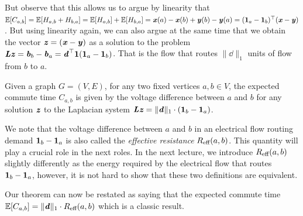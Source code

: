 But observe that this allows us to argue by linearity that $\mathbb{E}[C_{a,b}] = \mathbb{E}[H_{a,b} + H_{b,a}] = \mathbb{E}[H_{a,b}] + \mathbb{E}[H_{b,a}] = \boldsymbol{\mathit{x}}(a) - \boldsymbol{\mathit{x}}(b) + \boldsymbol{\mathit{y}}(b) - \boldsymbol{\mathit{y}}(a) = (\boldsymbol{1}_a - \boldsymbol{1}_b)^\top (\boldsymbol{\mathit{x}} - \boldsymbol{\mathit{y}})$. But using linearity again, we can also argue at the same time that we obtain the vector $\boldsymbol{\mathit{z}} = (\boldsymbol{\mathit{x}} - \boldsymbol{\mathit{y}})$ as a solution to the problem $\boldsymbol{\mathit{L}}\boldsymbol{\mathit{z}} = \boldsymbol{\mathit{b}}_b - \boldsymbol{\mathit{b}}_a = \boldsymbol{\mathit{d}}^\top \boldsymbol{1} (\boldsymbol{1}_a - \boldsymbol{1}_b)$. That is the flow that routes $\|\dd\|_1$ units of flow from $b$ to $a$.

\begin{theorem}
	Given a graph $G=(V,E)$, for any two fixed vertices $a,b \in V$, the expected commute time $C_{a,b}$ is given by the voltage difference between $a$ and $b$ for any solution $\boldsymbol{\mathit{z}}$ to the Laplacian system $\boldsymbol{\mathit{L}} \boldsymbol{\mathit{z}} = \|\boldsymbol{\mathit{d}}\|_1 \cdot (\boldsymbol{1}_b - \boldsymbol{1}_a)$.
\end{theorem}

We note that the voltage difference between $a$ and $b$ in an electrical flow routing demand $\boldsymbol{1}_b - \boldsymbol{1}_a$ is also called the \emph{effective resistance} $R_{\text{eff}}(a,b)$. This quantity will play a crucial role in the next roles. In the next lecture, we introduce $R_{\text{eff}}(a,b)$ slightly differently as the energy required by the electrical flow that routes $\boldsymbol{1}_b - \boldsymbol{1}_a$, however, it is not hard to show that these two definitions are equivalent.

Our theorem can now be restated as saying that the expected commute time $\mathbb{E}[C_{a,b}] = \|\boldsymbol{\mathit{d}}\|_1 \cdot R_{\text{eff}}(a,b)$ which is a classic result.